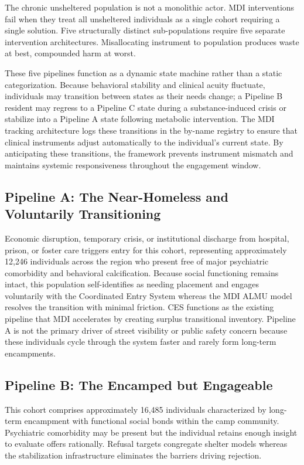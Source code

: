 \documentclass[12pt, letterpaper]{article}
\begin{document}
The chronic unsheltered population is not a monolithic actor. MDI interventions fail when they treat all unsheltered individuals as a single cohort requiring a single solution. Five structurally distinct sub-populations require five separate intervention architectures. Misallocating instrument to population produces waste at best, compounded harm at worst.

These five pipelines function as a dynamic state machine rather than a static categorization. Because behavioral stability and clinical acuity fluctuate, individuals may transition between states as their needs change; a Pipeline B resident may regress to a Pipeline C state during a substance-induced crisis or stabilize into a Pipeline A state following metabolic intervention. The MDI tracking architecture logs these transitions in the by-name registry to ensure that clinical instruments adjust automatically to the individual's current state. By anticipating these transitions, the framework prevents instrument mismatch and maintains systemic responsiveness throughout the engagement window.

\subsection{Pipeline A: The Near-Homeless and Voluntarily Transitioning}

Economic disruption, temporary crisis, or institutional discharge from hospital, prison, or foster care triggers entry for this cohort, representing approximately 12,246 individuals across the region who present free of major psychiatric comorbidity and behavioral calcification. Because social functioning remains intact, this population self-identifies as needing placement and engages voluntarily with the Coordinated Entry System whereas the MDI ALMU model resolves the transition with minimal friction. CES functions as the existing pipeline that MDI accelerates by creating surplus transitional inventory. Pipeline A is not the primary driver of street visibility or public safety concern because these individuals cycle through the system faster and rarely form long-term encampments.

\subsection{Pipeline B: The Encamped but Engageable}

This cohort comprises approximately 16,485 individuals characterized by long-term encampment with functional social bonds within the camp community. Psychiatric comorbidity may be present but the individual retains enough insight to evaluate offers rationally. Refusal targets congregate shelter models whereas the stabilization infrastructure eliminates the barriers driving rejection.
\end{document}

